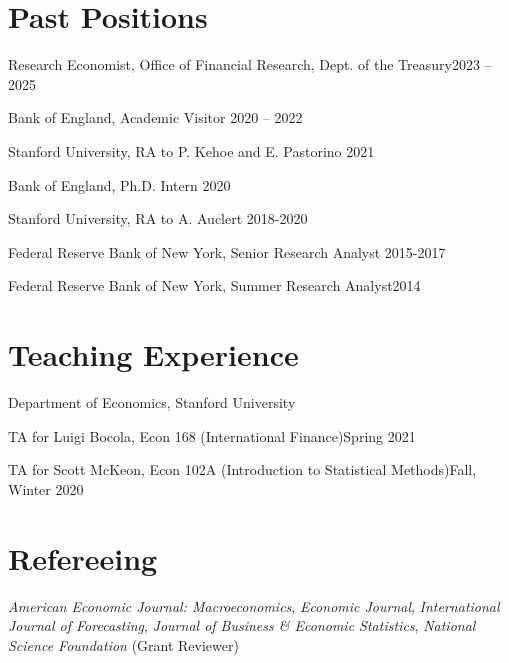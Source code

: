 \documentclass[margin,line]{res}                          %
\newenvironment{list1}{
	\begin{list}{\ding{113}}{%
			\setlength{\itemsep}{0in}
			\setlength{\parsep}{0in} \setlength{\parskip}{0in}
			\setlength{\topsep}{0in} \setlength{\partopsep}{0in}
			\setlength{\leftmargin}{0.17in}}}{\end{list}}
\begin{document}
\begin{resume}
	
	\section{\sc Past Positions}
	\begin{list1}
		\item[] Research Economist, Office of Financial Research, Dept. of the Treasury\hfill 2023 -- 2025
		\item[] Bank of England, Academic Visitor  \hfill 2020 -- 2022
		\smallskip
		\item[] Stanford University, RA to P. Kehoe and E. Pastorino  \hfill 2021
		\smallskip
		\item[] Bank of England, Ph.D. Intern \hfill 2020
		\smallskip
		\item[] {Stanford University}, RA to A. Auclert  \hfill 2018-2020 \smallskip
		\item[] {Federal Reserve Bank of New York}, Senior Research Analyst  \hfill 2015-2017 \smallskip
		\item[] {Federal Reserve Bank of New York}, Summer Research Analyst\hfill 2014
	\end{list1}
	
	
	\section{\sc Teaching Experience}
	\begin{list1}
		\item[] {Department of Economics, Stanford University} \smallskip
		\item[] TA for Luigi Bocola, Econ 168 (International Finance)\hfill Spring 2021\smallskip
		\item[] TA for Scott McKeon, Econ 102A (Introduction to Statistical Methods)\hfill Fall, Winter 2020\smallskip
	\end{list1}
	
	\section{\sc Refereeing}
	\begin{list1}
		\item[] \emph{American Economic Journal: Macroeconomics}, \emph{Economic Journal}, \emph{International Journal of Forecasting}, \emph{Journal of Business \& Economic Statistics}, \emph{National Science Foundation} (Grant Reviewer) \smallskip
	\end{list1}
	

\end{resume}
\end{document}
